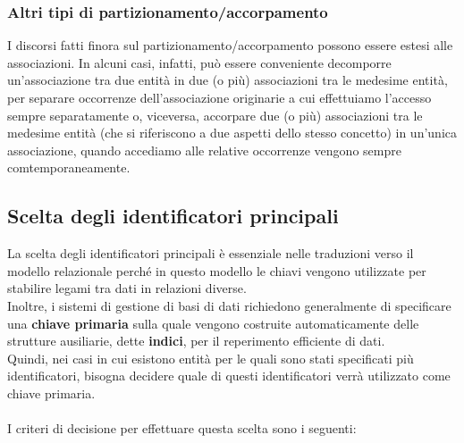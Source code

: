 \subsubsection{Altri tipi di partizionamento/accorpamento}
I discorsi fatti finora sul partizionamento/accorpamento possono essere estesi alle associazioni. In alcuni casi, infatti, può essere conveniente decomporre un'associazione tra due entità in due (o più) associazioni tra le medesime entità, per separare occorrenze dell'associazione originarie a cui effettuiamo l'accesso sempre separatamente o, viceversa, accorpare due (o più) associazioni tra le medesime entità (che si riferiscono a due aspetti dello stesso concetto) in un'unica associazione, quando accediamo alle relative occorrenze vengono sempre comtemporaneamente.


\subsection{Scelta degli identificatori principali}
La scelta degli identificatori principali è essenziale nelle traduzioni verso il modello relazionale perché in questo modello le chiavi vengono utilizzate per stabilire legami tra dati in relazioni diverse.\\
Inoltre, i sistemi di gestione di basi di dati richiedono generalmente di specificare una \textbf{chiave primaria} sulla quale vengono costruite automaticamente delle strutture ausiliarie, dette \textbf{indici}, per il reperimento efficiente di dati.\\
Quindi, nei casi in cui esistono entità per le quali sono stati specificati più identificatori, bisogna decidere quale di questi identificatori verrà utilizzato come chiave primaria.\\\\
I criteri di decisione per effettuare questa scelta sono i seguenti:
